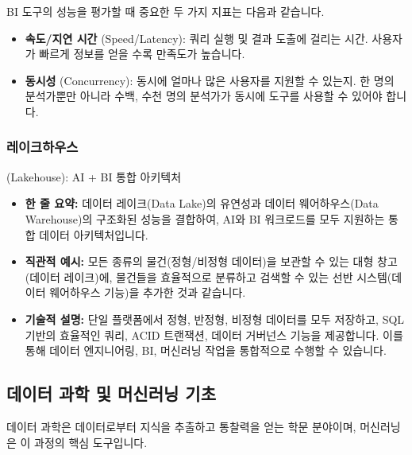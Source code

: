 \documentclass[11pt,a4paper]{article}
\theoremstyle{definition}
\begin{document}
\begin{tcolorbox}[summarybox={BI 도구의 주요 성과 지표 (KPIs)}]
BI 도구의 성능을 평가할 때 중요한 두 가지 지표는 다음과 같습니다.
\begin{itemize}
    \item \textbf{속도/지연 시간} (Speed/Latency): 쿼리 실행 및 결과 도출에 걸리는 시간. 사용자가 빠르게 정보를 얻을 수록 만족도가 높습니다.
    \item \textbf{동시성} (Concurrency): 동시에 얼마나 많은 사용자를 지원할 수 있는지. 한 명의 분석가뿐만 아니라 수백, 수천 명의 분석가가 동시에 도구를 사용할 수 있어야 합니다.
\end{itemize}
\end{tcolorbox}

\subsubsection*{레이크하우스} (Lakehouse): AI + BI 통합 아키텍처
\begin{itemize}
    \item \textbf{한 줄 요약:} 데이터 레이크(Data Lake)의 유연성과 데이터 웨어하우스(Data Warehouse)의 구조화된 성능을 결합하여, AI와 BI 워크로드를 모두 지원하는 통합 데이터 아키텍처입니다.
    \item \textbf{직관적 예시:} 모든 종류의 물건(정형/비정형 데이터)을 보관할 수 있는 대형 창고(데이터 레이크)에, 물건들을 효율적으로 분류하고 검색할 수 있는 선반 시스템(데이터 웨어하우스 기능)을 추가한 것과 같습니다.
    \item \textbf{기술적 설명:} 단일 플랫폼에서 정형, 반정형, 비정형 데이터를 모두 저장하고, SQL 기반의 효율적인 쿼리, ACID 트랜잭션, 데이터 거버넌스 기능을 제공합니다. 이를 통해 데이터 엔지니어링, BI, 머신러닝 작업을 통합적으로 수행할 수 있습니다.
\end{itemize}

\subsection*{데이터 과학 및 머신러닝 기초}
데이터 과학은 데이터로부터 지식을 추출하고 통찰력을 얻는 학문 분야이며, 머신러닝은 이 과정의 핵심 도구입니다.
\end{document}
